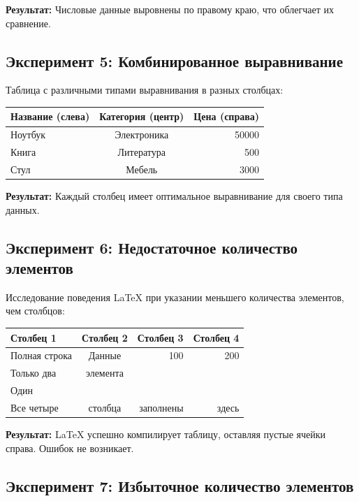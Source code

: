 \documentclass[12pt,a4paper]{article}
\begin{document}
\textbf{Результат:} Числовые данные выровнены по правому краю, что облегчает их сравнение.

\subsection{Эксперимент 5: Комбинированное выравнивание}

Таблица с различными типами выравнивания в разных столбцах:

\begin{center}
\begin{tabular}{|l|c|r|}
\hline
Название (слева) & Категория (центр) & Цена (справа) \\
\hline
Ноутбук & Электроника & 50000 \\
Книга & Литература & 500 \\
Стул & Мебель & 3000 \\
\hline
\end{tabular}
\end{center}

\textbf{Результат:} Каждый столбец имеет оптимальное выравнивание для своего типа данных.

\subsection{Эксперимент 6: Недостаточное количество элементов}

Исследование поведения LaTeX при указании меньшего количества элементов, чем столбцов:

\begin{center}
\begin{tabular}{|l|c|r|r|}
\hline
Столбец 1 & Столбец 2 & Столбец 3 & Столбец 4 \\
\hline
Полная строка & Данные & 100 & 200 \\
\hline
Только два & элемента & & \\
\hline
Один & & & \\
\hline
Все четыре & столбца & заполнены & здесь \\
\hline
\end{tabular}
\end{center}

\textbf{Результат:} LaTeX успешно компилирует таблицу, оставляя пустые ячейки справа. Ошибок не возникает.

\subsection{Эксперимент 7: Избыточное количество элементов}
\end{document}
